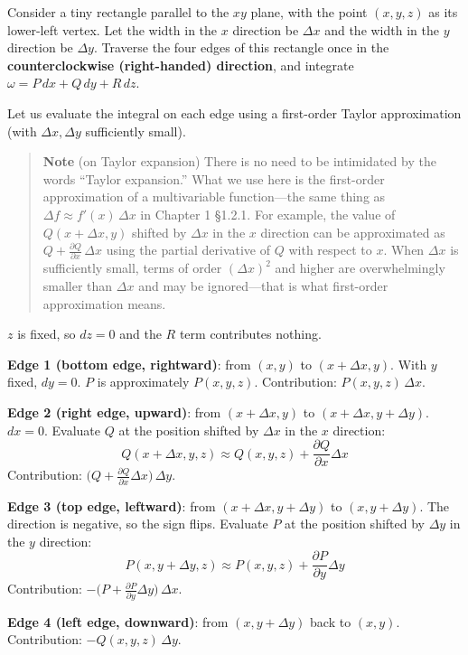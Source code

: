 Consider a tiny rectangle parallel to the \(xy\) plane, with the point
\((x, y, z)\) as its lower-left vertex. Let the width in the \(x\)
direction be \(\Delta x\) and the width in the \(y\) direction be
\(\Delta y\). Traverse the four edges of this rectangle once in the
\textbf{counterclockwise (right-handed) direction}, and integrate
\(\omega = P\,dx + Q\,dy + R\,dz\).

Let us evaluate the integral on each edge using a first-order Taylor
approximation (with \(\Delta x, \Delta y\) sufficiently small).

\begin{quote}
\textbf{Note} (on Taylor expansion) There is no need to be intimidated
by the words ``Taylor expansion.'' What we use here is the first-order
approximation of a multivariable function---the same thing as
\(\Delta f \approx f'(x)\,\Delta x\) in Chapter 1 §1.2.1. For example,
the value of \(Q(x+\Delta x, y)\) shifted by \(\Delta x\) in the \(x\)
direction can be approximated as
\(Q + \frac{\partial Q}{\partial x}\,\Delta x\) using the partial
derivative of \(Q\) with respect to \(x\). When \(\Delta x\) is
sufficiently small, terms of order \((\Delta x)^2\) and higher are
overwhelmingly smaller than \(\Delta x\) and may be ignored---that is
what first-order approximation means.
\end{quote}

\(z\) is fixed, so \(dz=0\) and the \(R\) term contributes nothing.

\textbf{Edge 1 (bottom edge, rightward)}: from \((x, y)\) to
\((x+\Delta x, y)\). With \(y\) fixed, \(dy=0\). \(P\) is approximately
\(P(x, y, z)\). Contribution: \(P(x, y, z)\,\Delta x\).

\textbf{Edge 2 (right edge, upward)}: from \((x+\Delta x, y)\) to
\((x+\Delta x, y+\Delta y)\). \(dx=0\). Evaluate \(Q\) at the position
shifted by \(\Delta x\) in the \(x\) direction:
\[Q(x+\Delta x, y, z) \approx Q(x, y, z) + \frac{\partial Q}{\partial x}\Delta x\]
Contribution:
\(\bigl(Q + \frac{\partial Q}{\partial x}\Delta x\bigr)\,\Delta y\).

\textbf{Edge 3 (top edge, leftward)}: from \((x+\Delta x, y+\Delta y)\)
to \((x, y+\Delta y)\). The direction is negative, so the sign flips.
Evaluate \(P\) at the position shifted by \(\Delta y\) in the \(y\)
direction:
\[P(x, y+\Delta y, z) \approx P(x, y, z) + \frac{\partial P}{\partial y}\Delta y\]
Contribution:
\(-\bigl(P + \frac{\partial P}{\partial y}\Delta y\bigr)\,\Delta x\).

\textbf{Edge 4 (left edge, downward)}: from \((x, y+\Delta y)\) back to
\((x, y)\). Contribution: \(-Q(x, y, z)\,\Delta y\).

